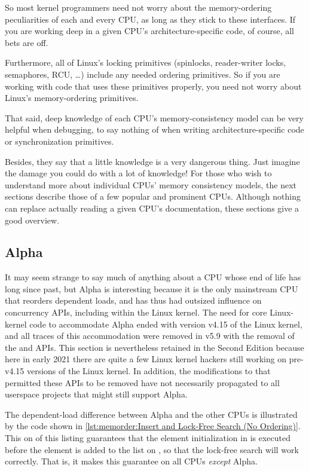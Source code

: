So most kernel programmers need not worry about the memory-ordering
peculiarities of each and every CPU, as long as they stick to these
interfaces.
If you are working deep in a given CPU's architecture-specific code,
of course, all bets are off.

Furthermore,
all of Linux's locking primitives (spinlocks, reader-writer locks,
semaphores, RCU, \ldots) include any needed ordering primitives.
So if you are working with code that uses these primitives properly,
you need not worry about Linux's memory-ordering primitives.

That said, deep knowledge of each CPU's memory-consistency model
can be very helpful when debugging, to say nothing of when writing
architecture-specific code or synchronization primitives.

Besides, they say that a little knowledge is a very dangerous thing.
Just imagine the damage you could do with a lot of knowledge!
For those who wish to understand more about individual CPUs'
memory consistency models, the next sections describe those of a few
popular and prominent CPUs.
Although nothing can replace actually reading a given CPU's documentation,
these sections give a good overview.

\subsection{Alpha}
\label{sec:memorder:Alpha}

It may seem strange to say much of anything about a CPU whose end of life
has long since past, but Alpha is interesting because it is the only
mainstream CPU that reorders dependent loads, and has thus had outsized
influence on concurrency APIs, including within the Linux kernel.
The need for core Linux-kernel code to accommodate Alpha ended
with version v4.15 of the Linux kernel, and all traces of this
accommodation were removed in v5.9 with the removal of the
 and  APIs.
This section is nevertheless retained in the Second Edition
because here in early 2021 there are quite a few Linux kernel hackers
still working on pre-v4.15 versions of the Linux kernel.
In addition, the modifications to  that permitted
these APIs to be removed have not necessarily propagated to all
userspace projects that might still support Alpha.

\begin{fcvref}
The dependent-load difference between Alpha and the other CPUs is
illustrated by the code shown in
\cref{lst:memorder:Insert and Lock-Free Search (No Ordering)}.
This  on  of this listing
guarantees that the element initialization
in  is executed before the element is added to the
list on , so that the lock-free search will work correctly.
That is, it makes this guarantee on all CPUs {\em except} Alpha.
\end{fcvref}

